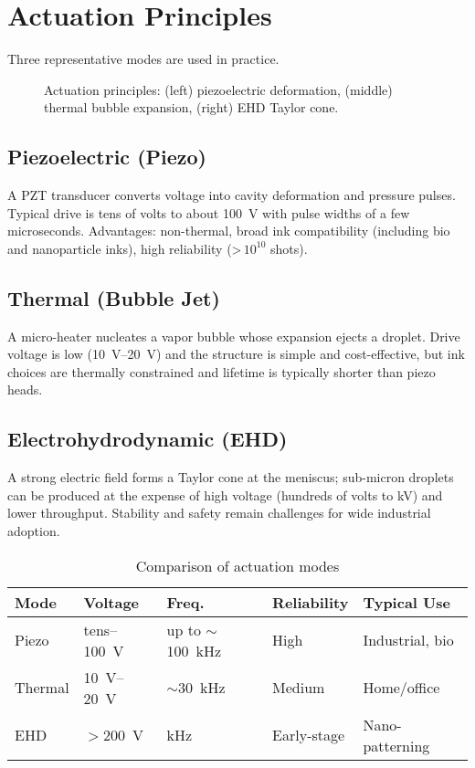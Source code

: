 \documentclass[conference]{IEEEtran}
\begin{document}
\section{Actuation Principles}
Three representative modes are used in practice.

\begin{figure}[!tbp]   %
  \centering
  
  \caption{Actuation principles: (left) piezoelectric deformation, (middle) thermal bubble expansion, (right) EHD Taylor cone.}
  \label{fig:actuation_modes}
\end{figure}

\subsection{Piezoelectric (Piezo)}
A PZT transducer converts voltage into cavity deformation and pressure pulses. Typical drive is tens of volts to about \SI{100}{V} with pulse widths of a few microseconds. Advantages: non-thermal, broad ink compatibility (including bio and nanoparticle inks), high reliability (>\,$10^{10}$ shots).

\subsection{Thermal (Bubble Jet)}
A micro-heater nucleates a vapor bubble whose expansion ejects a droplet. Drive voltage is low (\SIrange{10}{20}{V}) and the structure is simple and cost-effective, but ink choices are thermally constrained and lifetime is typically shorter than piezo heads.

\subsection{Electrohydrodynamic (EHD)}
A strong electric field forms a Taylor cone at the meniscus; sub-micron droplets can be produced at the expense of high voltage (hundreds of volts to kV) and lower throughput. Stability and safety remain challenges for wide industrial adoption.

\begin{table}[!t]
\caption{Comparison of actuation modes}
\label{tab:actuation}
\centering\footnotesize
\begin{tabular*}{\columnwidth}{@{\extracolsep{\fill}}lllll@{}}
\toprule
Mode & Voltage & Freq. & Reliability & Typical Use \\
\midrule
Piezo   & tens--\SI{100}{V} & up to $\sim$\SI{100}{kHz} & High   & Industrial, bio \\
Thermal & \SIrange{10}{20}{V} & $\sim$\SI{30}{kHz}       & Medium & Home/office \\
EHD     & $>$\SI{200}{V}    & kHz                       & Early-stage & Nano-patterning \\
\bottomrule
\end{tabular*}
\end{table}
\end{document}
